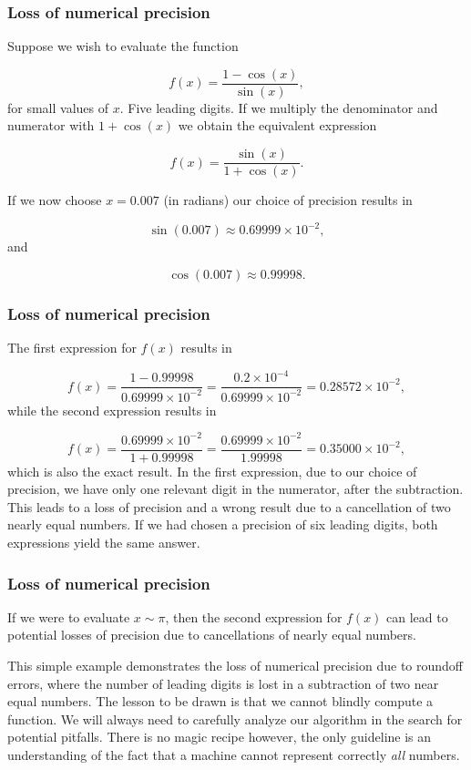 \documentclass{beamer}
\begin{document}
\begin{frame}
\frametitle{Loss of numerical precision}

Suppose we wish to evaluate the function

\[
   f(x)=\frac{1-\cos(x)}{\sin(x)},
\]
for small values of $x$. Five leading digits. If we multiply the denominator and numerator
with $1+\cos(x)$ we obtain the equivalent expression

\[
   f(x)=\frac{\sin(x)}{1+\cos(x)}.
\]

If we now choose $x=0.007$ (in radians) our choice of precision results in

\[
   \sin(0.007)\approx 0.69999\times 10^{-2},
\]
and

\[
   \cos(0.007)\approx 0.99998.
\]
\end{frame}

\begin{frame}
\frametitle{Loss of numerical precision}

The first expression for $f(x)$ results in

\[
   f(x)=\frac{1-0.99998}{0.69999\times 10^{-2}}=\frac{0.2\times 10^{-4}}{0.69999\times 10^{-2}}=0.28572\times 10^{-2},
\]
while the second expression results in

\[
   f(x)=\frac{0.69999\times 10^{-2}}{1+0.99998}=
\frac{0.69999\times 10^{-2}}{1.99998}=0.35000\times 10^{-2},
\]
which is also the exact result. In the first expression, due to our
choice of precision, we have
only one relevant digit in the numerator, after the
subtraction. This leads to a loss of precision and a wrong result due to
a cancellation of two nearly equal numbers.
If we had chosen a precision of six leading digits, both expressions
yield the same answer.
\end{frame}

\begin{frame}
\frametitle{Loss of numerical precision}

If we were to evaluate $x\sim \pi$, then the second expression for $f(x)$
can lead to potential losses of precision due to cancellations of nearly
equal numbers.

This simple example demonstrates  the loss of numerical precision due
to roundoff errors, where the number of leading digits is lost
in a subtraction of two near equal numbers.
The lesson to be drawn is that we cannot blindly compute a function.
We will always need to carefully analyze our algorithm in the search for
potential pitfalls. There is no magic recipe however, the only guideline
is an understanding of the fact that a machine cannot represent
correctly \emph{all} numbers.
\end{frame}
\end{document}
